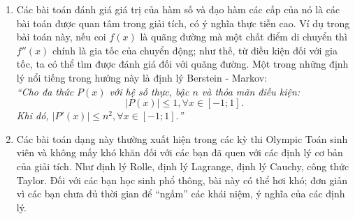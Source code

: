 \begin{bt}
{		\begin{nx}\hfill
			\begin{enumerate}
				\item Các bài toán đánh giá giá trị của hàm số và đạo hàm các cấp của nó là các bài toán được quan tâm trong giải tích, có ý nghĩa thực tiễn cao. Ví dụ trong bài toán này, nếu coi $f(x)$ là quãng đường mà một chất điểm di chuyển thì $f''(x)$ chính là gia tốc của chuyển động; như thế, từ điều kiện đối với gia tốc, ta có thể tìm được đánh giá đối với quãng đường. Một trong những định lý nổi tiếng trong hướng này là định lý Berstein - Markov:\\
				\textit{``Cho đa thức $P(x)$ với hệ số thực, bậc $n$ và thỏa mãn điều kiện:
					\[|P(x)|\le 1, \forall x\in [-1;1].\]
					Khi đó, $|P'(x)|\le n^2, \forall x\in [-1;1].$''
				}
				\item Các bài toán dạng này thường xuất hiện trong các kỳ thi Olympic Toán sinh viên và không mấy khó khăn đối với các bạn đã quen với các định lý cơ bản của giải tích. Như định lý Rolle, định lý Lagrange, định lý Cauchy, công thức Taylor. Đối với các bạn học sinh phổ thông, bài này có thể hơi khó; đơn giản vì các bạn chưa đủ thời gian để ``ngấm'' các khái niệm, ý nghĩa của các định lý.
			\end{enumerate}
		\end{nx}
	}
\end{bt}

